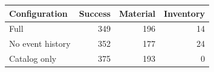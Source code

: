 \begin{tabular}{@{}lrrr@{}}
\toprule
Configuration & Success & Material & Inventory \\
\midrule
Full & 349 & 196 & 14 \\
No event history & 352 & 177 & 24 \\
Catalog only & 375 & 193 & 0 \\
\bottomrule
\end{tabular}
